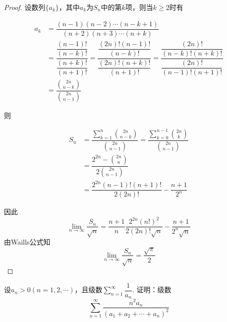 \begin{proof}
    
    设数列$\{a_k\}$，其中$a_k$为$S_n$中的第$k$项，则当$k \geq 2$时有

    \begin{align*}
        a_k & = \dfrac{(n - 1)(n - 2)\cdots(n - k + 1)}{(n + 2)(n + 3)\cdots(n + k)} \\
        & = \dfrac{\dfrac{(n - 1)!}{(n - k)!}}{\dfrac{(n + k)!}{(n + 1)!}} = \dfrac{\dfrac{(2n)!(n - 1)!}{(n - k)!}}{\dfrac{(2n)!(n + k)!}{(n + 1)!}} = \dfrac{\dfrac{(2n)!}{(n - k)!(n + k)!}}{\dfrac{(2n)!}{(n - 1)!(n + 1)!}} \\
        & = \dfrac{\binom{2n}{n - k}}{\binom{2n}{n - 1}}
    \end{align*}

    则
    
    \begin{align*}
        S_n & = \dfrac{\sum\limits_{k  = 1}^{n}{\binom{2n}{n - k}}}{\binom{2n}{n - 1}} = \dfrac{\sum\limits_{k = 0}^{n - 1}{\binom{2n}{k}}}{\binom{2n}{n - 1}} \\
        & = \dfrac{2^{2n} - \binom{2n}{n}}{2\binom{2n}{n - 1}} \\
        & = \dfrac{2^{2n}(n - 1)!(n + 1)!}{2(2n)!} - \dfrac{n + 1}{2^n}  
    \end{align*}

    因此
        \[\lim\limits_{n \to \infty}{\dfrac{S_n}{\sqrt{n}}} = \dfrac{n + 1}{n} \dfrac{2^{2n}(n!)^2}{2(2n)!\sqrt{n}} - \dfrac{n + 1}{2^n\sqrt{n}}\]
    由\textup{Waills}公式知
        \[\lim\limits_{n \to \infty}{\dfrac{S_n}{\sqrt{n}}} = \dfrac{\sqrt{\pi}}{2}\]

\end{proof}

\begin{proposition}
    
    设$a_n > 0(n = 1, 2, \cdots)$，且级数$\sum\limits_{n = 1}^{\infty}{\dfrac{1}{a_n}}$. 证明：级数
    \[ \sum\limits_{n = 1}^{\infty}{\dfrac{n^2a_n}{(a_1 + a_2 + \cdots + a_n)^2}} \]

\end{proposition}

